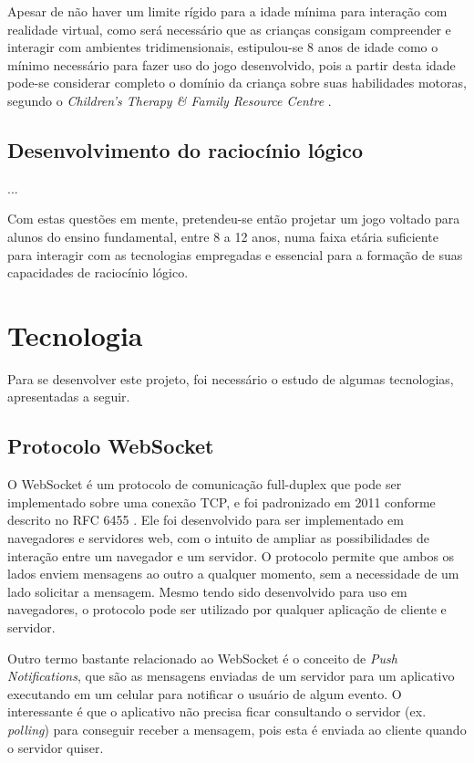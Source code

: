 Apesar de não haver um limite rígido para a idade mínima para interação com
realidade virtual, como será necessário que as crianças consigam compreender
e interagir com ambientes tridimensionais, estipulou-se 8 anos de idade como
o mínimo necessário para fazer uso do jogo desenvolvido, pois a partir desta
idade pode-se considerar completo o domínio da criança sobre suas habilidades
motoras, segundo o \textit{Children’s Therapy \& Family Resource Centre} \cite{ctfrc:motor-skills}.

\subsection{Desenvolvimento do raciocínio lógico}
...

Com estas questões em mente, pretendeu-se então projetar um jogo voltado para
alunos do ensino fundamental, entre 8 a 12 anos, numa faixa etária suficiente
para interagir com as tecnologias empregadas e essencial para a formação de
suas capacidades de raciocínio lógico.


\section{Tecnologia}\label{sec-tecnologia}

Para se desenvolver este projeto, foi necessário o estudo de algumas tecnologias, apresentadas a seguir. 
\subsection{Protocolo WebSocket}\label{subsec-teo-websocket}

O WebSocket é um protocolo de comunicação full-duplex que pode ser implementado
sobre uma conexão TCP, e foi padronizado em 2011 conforme descrito no RFC 6455
\cite{RFC:2011:websocket}. Ele foi desenvolvido para ser implementado em 
navegadores e servidores web, com o intuito de ampliar as possibilidades de
interação entre um navegador e um servidor. O protocolo permite que ambos os 
lados enviem mensagens ao outro a qualquer momento, sem a necessidade de um 
lado solicitar a mensagem. Mesmo tendo sido desenvolvido para uso em navegadores, 
o protocolo pode ser utilizado por qualquer aplicação de cliente e servidor.

Outro termo bastante relacionado ao WebSocket é o conceito de 
\textit{Push Notifications}, que são as mensagens enviadas de um servidor para 
um aplicativo executando em um celular para notificar o usuário de algum evento. 
O interessante é que o aplicativo não precisa ficar consultando o servidor 
(ex. \textit{polling}) para conseguir receber a mensagem, pois esta é enviada 
ao cliente quando o servidor quiser.

